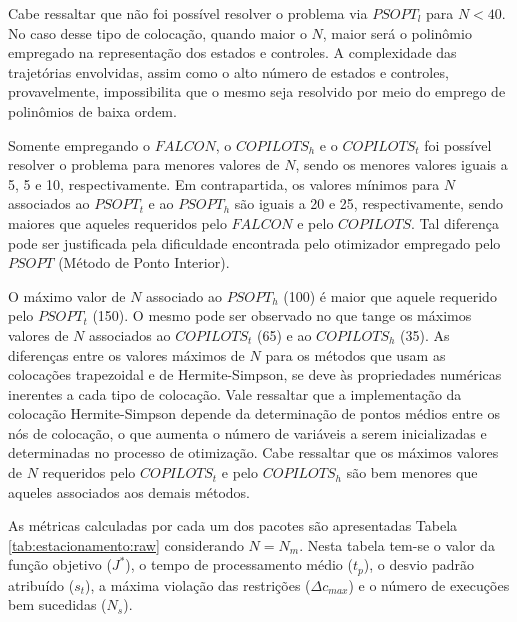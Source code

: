 Cabe ressaltar que não foi possível resolver o problema via $PSOPT_l$ para $N < 40$. No caso desse tipo de colocação, quando maior o $N$, maior será o polinômio empregado na representação dos estados e controles. A complexidade das trajetórias envolvidas, assim como o alto número de estados e controles, provavelmente, impossibilita que o mesmo seja resolvido por meio do emprego de polinômios de baixa ordem.

Somente empregando o $FALCON$, o $COPILOTS_h$ e o $COPILOTS_t$ foi possível resolver o problema para menores valores de $N$, sendo os menores valores iguais a 5, 5 e 10, respectivamente. Em contrapartida,  os valores mínimos para $N$ associados ao $PSOPT_t$ e ao $PSOPT_h$ são iguais a 20 e 25, respectivamente, sendo maiores que aqueles requeridos pelo $FALCON$ e pelo $COPILOTS$. Tal diferença pode ser justificada pela dificuldade encontrada pelo otimizador empregado pelo $PSOPT$ (Método de Ponto Interior).

O máximo valor de $N$ associado ao $PSOPT_h$ (100) é maior que aquele requerido pelo $PSOPT_t$ (150). O mesmo pode ser observado no que tange os máximos valores de $N$ associados ao $COPILOTS_t$ (65) e ao $COPILOTS_h$ (35). As diferenças entre os valores máximos de $N$ para os métodos que usam as colocações trapezoidal e de Hermite-Simpson, se deve às propriedades numéricas inerentes a cada tipo de colocação. Vale ressaltar que a implementação da colocação Hermite-Simpson depende da determinação de pontos médios entre os nós de colocação, o que aumenta o número de variáveis a serem inicializadas e determinadas no processo de otimização. Cabe ressaltar que os máximos valores de $N$ requeridos pelo $COPILOTS_t$ e pelo $COPILOTS_h$ são bem menores que aqueles associados aos demais métodos. 


As métricas calculadas por cada um dos pacotes são apresentadas Tabela \ref{tab:estacionamento:raw} considerando $N=N_m$. Nesta tabela tem-se o valor da função objetivo ($ J^* $), o tempo de processamento médio ($ t_p $), o desvio padrão atribuído ($ s_t $), a máxima violação das restrições ($ \Delta c_{max} $) e o número de execuções bem sucedidas ($ N_s $).




